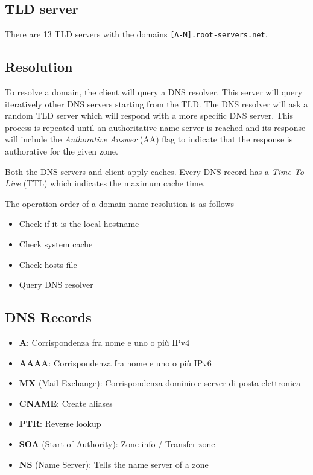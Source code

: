 \documentclass[a4paper]{article}
\begin{document}
\subsection{TLD server}

There are 13 TLD servers with the domains \texttt{[A-M].root-servers.net}.

\subsection{Resolution}

To resolve a domain, the client will query a DNS resolver. This server will query iteratively
other DNS servers starting from the TLD. The DNS resolver will ask a random TLD server which
will respond with a more specific DNS server. This process is repeated until an authoritative name server
is reached and its response will include the \textit{Authorative Answer} (AA) flag to indicate that
the response is authorative for the given zone.

Both the DNS servers and client apply caches.
Every DNS record has a \textit{Time To Live} (TTL) which indicates the maximum cache time.

The operation order of a domain name resolution is as follows
\begin{itemize}
    \item Check if it is the local hostname
    \item Check system cache
    \item Check hosts file
    \item Query DNS resolver
\end{itemize}

\subsection{DNS Records}

\begin{itemize}
    \item \textbf{A}: Corrispondenza fra nome e uno o più IPv4
    \item \textbf{AAAA}: Corrispondenza fra nome e uno o più IPv6
    \item \textbf{MX} (Mail Exchange): Corrispondenza dominio e server di posta elettronica
    \item \textbf{CNAME}: Create aliases
    \item \textbf{PTR}: Reverse lookup
    \item \textbf{SOA} (Start of Authority): Zone info / Transfer zone
    \item \textbf{NS} (Name Server): Tells the name server of a zone
\end{itemize}
\end{document}
